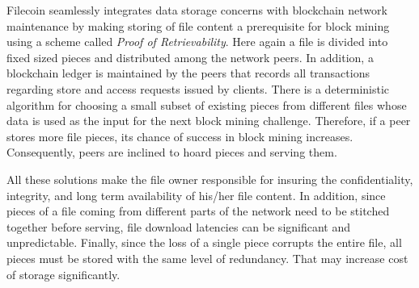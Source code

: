 Filecoin \cite{filecoin} seamlessly integrates data storage concerns with blockchain network maintenance by making storing of file content a prerequisite for block mining using a scheme called {\it Proof of Retrievability}. Here again a file is divided into fixed sized pieces and distributed among the network peers. In addition, a blockchain ledger is maintained by the peers that records all transactions regarding store and access requests issued by clients. There is a deterministic algorithm for choosing a small subset of existing pieces from different files whose data is used as the input for the next block mining challenge. Therefore, if a peer stores more file pieces, its chance of success in block mining increases. Consequently, peers are inclined to hoard pieces and serving them.   

All these solutions make the file owner responsible for insuring the confidentiality, integrity, and long term availability of his/her file content. In addition, since pieces of a file coming from different parts of the network need to be stitched together before serving, file download latencies can be significant and unpredictable. Finally, since the loss of a single piece corrupts the entire file, all pieces must be stored with the same level of redundancy. That may increase cost of storage significantly.

